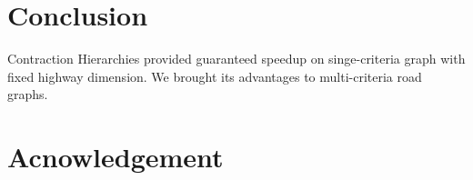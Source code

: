 

\section{Conclusion}
\label{secConclusion}
Contraction Hierarchies provided guaranteed speedup on singe-criteria graph
with fixed highway dimension. We brought its advantages to multi-criteria 
road graphs.


\section*{Acnowledgement}







\newpage


